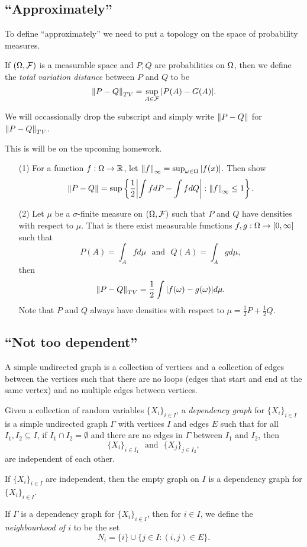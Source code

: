 \subsection{``Approximately''}
To define ``approximately'' we need to put a topology on the space of probability measures.
\begin{defn}
    If $({{\Omega}}, {\mathcal{F}})$ is a measurable space and $P,Q$ are probabilities on ${{\Omega}}$, then we define the \emph{total variation distance} between $P$ and $Q$ to be 
    \[\left\|P-Q\right\|_{TV} = \sup_{A \in {\mathcal{F}}}{\left\lvert P(A)-G(A)\right\rvert}. \]
\end{defn}
We will occassionally drop the subscript and simply write $\left\|P-Q\right\|$ for $\left\|P-Q\right\|_{TV}$.
\begin{exer}
    This is will be on the upcoming homework. 
    \begin{enumerate}
        \item[(1)] For a function $f : {{\Omega}} \to {\mathbb R}$, let $\left\|f\right\|_\infty = \sup_{{\omega} \in {{\Omega}}} {\left\lvert f(x)\right\rvert}$. Then show \[\left\|P-Q\right\| = \sup \left\{\frac{1}{2}{\left\lvert\int f dP - \int f dQ\right\rvert}: \left\|f\right\|_\infty \le 1\right\}.\]
        \item[(2)] Let $\mu$ be a $\sigma$-finite measure on $({{\Omega}},{\mathcal{F}})$ such that $P$ and $Q$ have densities with respect to $\mu$. That is there exist measurable functions $f,g: {{\Omega}} \to [0,\infty]$ such that  
        \[P(A) = \int_A fd\mu ~~~\text{and}~~~ Q(A) = \int_A g d\mu, \]
        then 
        \[\left\|P-Q\right\|_{TV} = \frac{1}{2}\int{\left\lvert f({\omega})-g({\omega})\right\rvert}d\mu. \] 
        Note that $P$ and $Q$ always have densities with respect to $\mu = \frac{1}{2}P+\frac{1}{2}Q$.
    \end{enumerate}
\end{exer}
\subsection{``Not too dependent''}
A simple undirected graph is a collection of vertices and a collection of edges between the vertices such that there are no loops (edges that start and end at the same vertex) and no multiple edges between vertices.
\begin{defn}
    Given a collection of random variables $\{X_i\}_{i \in I}$, a \emph{dependency graph} for $\{X_i\}_{i \in I}$ is a simple undirected graph $\Gamma$ with vertices $I$ and edges $E$ such that for all $I_1,I_2 \subseteq I$, if $I_1 \cap I_2 = \emptyset$ and there are no edges in $\Gamma$ between $I_1$ and $I_2$, then 
    \[\{X_i\}_{i \in I_1} ~~~\text{and}~~~\{X_j\}_{j \in I_2}, \]
    are independent of each other.
\end{defn}
\begin{ex}
    If $\{X_i\}_{i \in I}$ are independent, then the empty graph on $I$ is a dependency graph for $\{X_i\}_{i \in I}$.
\end{ex}
\begin{defn}
    If $\Gamma$ is a dependency graph for $\{X_i\}_{i \in I}$, then for $i \in I$, we define the \emph{neighbourhood of $i$} to be the set 
    \[N_i = \{i\} \cup \{j \in I: (i,j) \in E\}. \]
\end{defn}
